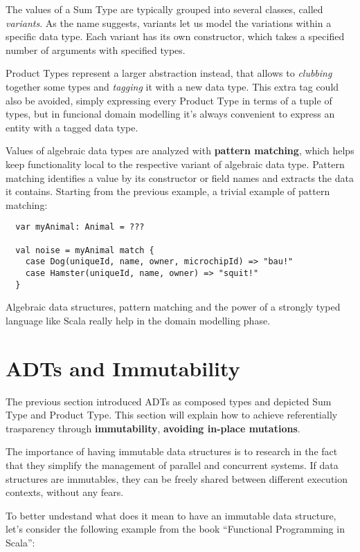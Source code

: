 The values of a Sum Type are typically grouped into several classes,
called \emph{variants}. As the name suggests, variants let us model the
variations within a specific data type. Each variant has its own
constructor, which takes a specified number of arguments with specified
types.

Product Types represent a larger abstraction instead, that allows to
\emph{clubbing} together some types and \emph{tagging} it with a new
data type. This extra tag could also be avoided, simply expressing every
Product Type in terms of a tuple of types, but in funcional domain
modelling it's always convenient to express an entity with a tagged data
type.

Values of algebraic data types are analyzed with \textbf{pattern
matching}, which helps keep functionality local to the respective
variant of algebraic data type. Pattern matching identifies a value by
its constructor or field names and extracts the data it contains.
Starting from the previous example, a trivial example of pattern
matching:

\begin{verbatim}
  var myAnimal: Animal = ???

  val noise = myAnimal match {
    case Dog(uniqueId, name, owner, microchipId) => "bau!"
    case Hamster(uniqueId, name, owner) => "squit!"
  }
\end{verbatim}

Algebraic data structures, pattern matching and the power of a strongly
typed language like Scala really help in the domain modelling phase.

\section{ADTs and Immutability}\label{adts-and-immutability}

The previous section introduced ADTs as composed types and depicted Sum
Type and Product Type. This section will explain how to achieve
referentially trasparency through \textbf{immutability},
\textbf{avoiding in-place mutations}.

The importance of having immutable data structures is to research in the
fact that they simplify the management of parallel and concurrent
systems. If data structures are immutables, they can be freely shared
between different execution contexts, without any fears.

To better undestand what does it mean to have an immutable data
structure, let's consider the following example from the book
``Functional Programming in Scala'':

